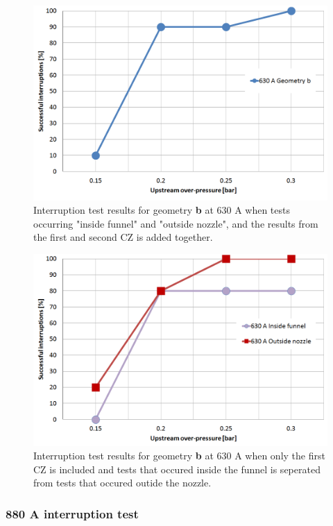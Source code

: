 \documentclass[10pt,b5paper,twoside]{article}
\begin{document}
\begin{figure}[H]
\centering
\includegraphics[scale=0.45]{Bilder/Results/geoB630amp.png}
\caption{Interruption test results for geometry \textbf{b} at 630 A when tests occurring "inside funnel" and "outside nozzle", and the results from the first and second CZ is added together.} \label{fig:results630AgeoB}
\end{figure}

\begin{figure}[H]
\centering
\includegraphics[scale=0.45]{Bilder/Results/geoB630ampcomp.png}
\caption{Interruption test results for geometry \textbf{b} at 630 A when only the first CZ is included and tests that occured inside the funnel is seperated from tests that occured outide the nozzle.} \label{fig:results630AgeoBcomp}
\end{figure}

\subsubsection*{880 A interruption test}
\end{document}
